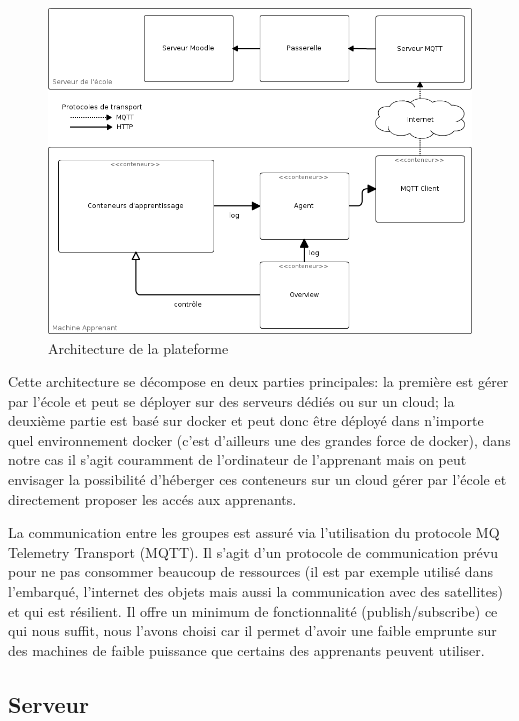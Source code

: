 \documentclass[a4paper,11pt]{report}
\begin{document}
\begin{figure}[h]
   \caption{\label{architecture} Architecture de la plateforme}
   \includegraphics[width=\textwidth, keepaspectratio=true]{architecture.png}
\end{figure}

Cette architecture se décompose en deux parties principales: la première est gérer par l'école et peut se déployer sur des serveurs dédiés ou sur un cloud; la deuxième partie est basé sur docker et peut donc être déployé dans n'importe quel environnement docker (c'est d'ailleurs une des grandes force de docker), dans notre cas il s'agit couramment de l'ordinateur de l'apprenant mais on peut envisager la possibilité d'héberger ces conteneurs sur un cloud gérer par l'école et directement proposer les accés aux apprenants.

La communication entre les groupes est assuré via l'utilisation du protocole MQ Telemetry Transport (MQTT). Il s'agit d'un protocole de communication prévu pour ne pas consommer beaucoup de ressources (il est par exemple utilisé dans l'embarqué, l'internet des objets mais aussi la communication avec des satellites) et qui est résilient. Il offre un minimum de fonctionnalité (publish/subscribe) ce qui nous suffit, nous l'avons choisi car il permet d'avoir une faible emprunte sur des machines de faible puissance que certains des apprenants peuvent utiliser.

\subsection{Serveur}
\end{document}

